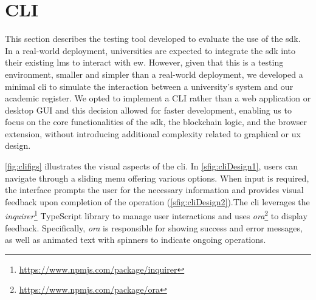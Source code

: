\section{CLI}
\label{sec:cliDesign}
This section describes the testing tool developed to evaluate the use of the \acrshort{sdk}. In a real-world deployment, universities are expected to integrate the \acrshort{sdk} into their existing \acrshort{lms} to interact with \acrlong{ew}. However, given that this is a testing environment, smaller and simpler than a real-world deployment, we developed a minimal \acrlong{cli} to simulate the interaction between a university's system and our academic register. We opted to implement a CLI rather than a web application or desktop GUI and this decision allowed for faster development, enabling us to focus on the core functionalities of the \acrshort{sdk}, the blockchain logic, and the browser extension, without introducing additional complexity related to graphical or \acrfull{ux} design.

\cref{fig:clifigs} illustrates the visual aspects of the \acrshort{cli}. In \cref{sfig:cliDesign1}, users can navigate through a sliding menu offering various options. When input is required, the interface prompts the user for the necessary information and provides visual feedback upon completion of the operation (\cref{sfig:cliDesign2}).The \acrshort{cli} leverages the \textit{inquirer}\footnote{\url{https://www.npmjs.com/package/inquirer}} TypeScript library to manage user interactions and uses \textit{ora}\footnote{\url{https://www.npmjs.com/package/ora}} to display feedback. Specifically, \textit{ora} is responsible for showing success and error messages, as well as animated text with spinners to indicate ongoing operations.

